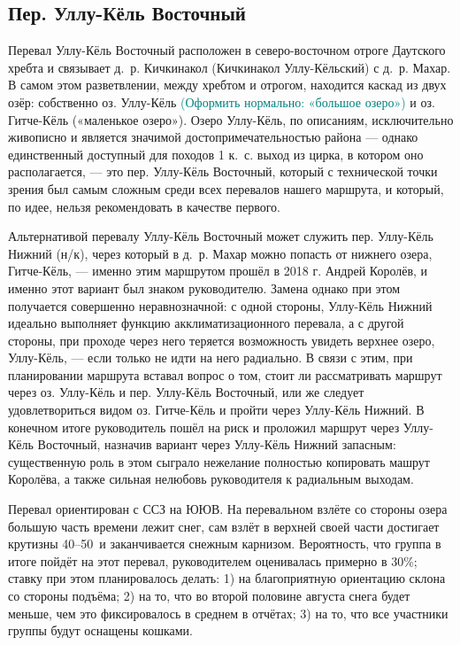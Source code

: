 \subsection{Пер. Уллу-Кёль Восточный} 
Перевал Уллу-Кёль Восточный расположен в северо-восточном отроге Даутского хребта и связывает д.~р. Кичкинакол (Кичкинакол Уллу-Кёльский) с д.~р. Махар. В самом этом разветвлении, между хребтом и отрогом, находится каскад из двух озёр: собственно оз. Уллу-Кёль \textcolor{teal}{(Оформить нормально: «большое озеро»)} и оз. Гитче-Кёль («маленькое озеро»). Озеро Уллу-Кёль, по описаниям, исключительно живописно и является значимой достопримечательностью района --- однако единственный доступный для походов 1 к.~с. выход из цирка, в котором оно располагается, --- это пер. Уллу-Кёль Восточный, который с технической точки зрения был самым сложным среди всех перевалов нашего маршрута, и который, по идее, нельзя рекомендовать в качестве первого. 

Альтернативой перевалу Уллу-Кёль Восточный может служить пер. Уллу-Кёль Нижний (н/к), через который в д.~р. Махар можно попасть от нижнего озера, Гитче-Кёль, --- именно этим маршрутом прошёл в 2018 г. Андрей Королёв, и именно этот вариант был знаком руководителю. Замена однако при этом получается совершенно неравнозначной: с одной стороны, Уллу-Кёль Нижний идеально выполняет функцию акклиматизационного перевала, а с другой стороны, при проходе через него теряется возможность увидеть верхнее озеро, Уллу-Кёль, --- если только не идти на него радиально. В связи с этим, при планировании маршрута вставал вопрос о том, стоит ли рассматривать маршрут через оз. Уллу-Кёль и пер. Уллу-Кёль Восточный, или же следует удовлетвориться видом оз. Гитче-Кёль и пройти через Уллу-Кёль Нижний. В конечном итоге руководитель пошёл на риск и проложил маршрут через Уллу-Кёль Восточный, назначив вариант через Уллу-Кёль Нижний запасным: существенную роль в этом сыграло нежелание полностью копировать машрут Королёва, а также сильная нелюбовь руководителя к радиальным выходам. 

Перевал ориентирован с ССЗ на ЮЮВ. На перевальном взлёте со стороны озера большую часть времени лежит снег, сам взлёт в верхней своей части достигает крутизны 40--50\degree~и заканчивается снежным карнизом. Вероятность, что группа в итоге пойдёт на этот перевал, руководителем оценивалась примерно в 30\%; ставку при этом планировалось делать: 1) на благоприятную ориентацию склона со стороны подъёма; 2) на то, что во второй половине августа снега будет меньше, чем это фиксировалось в среднем в отчётах; 3) на то, что все участники группы будут оснащены кошками. 